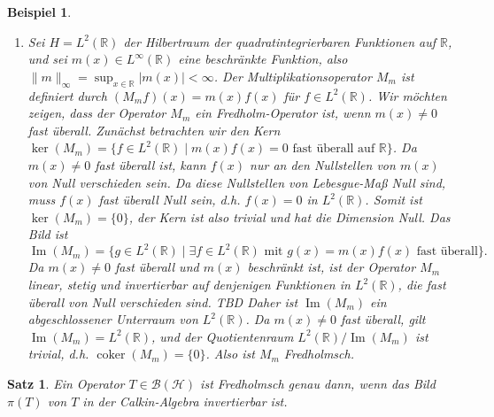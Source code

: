 \documentclass[11pt, hidelinks]{article}
\newcommand{\h}{\mathcal{H}}
\numberwithin{conj}{section}
\newtheorem{example}[conj]{Beispiel}
\newtheorem{theorem}[conj]{Satz}
\begin{document}
\begin{example}
\begin{enumerate}
        \item Sei \( H = L^2(\mathbb{R}) \) der Hilbertraum der quadratintegrierbaren Funktionen auf \( \mathbb{R} \), und sei \( m(x) \in L^\infty(\mathbb{R}) \) eine beschränkte Funktion, also \( \|m\|_\infty = \sup_{x \in \mathbb{R}} |m(x)| < \infty \). Der Multiplikationsoperator \( M_m \) ist definiert durch \( (M_m f)(x) = m(x) f(x) \) für \( f \in L^2(\mathbb{R}) \). Wir möchten zeigen, dass der Operator \( M_m \) ein Fredholm-Operator ist, wenn \( m(x) \neq 0 \) fast überall. Zunächst betrachten wir den Kern $\ker(M_m) = \{ f \in L^2(\mathbb{R}) \mid m(x) f(x) = 0 \text{ fast überall auf } \mathbb{R} \}$. Da \( m(x) \neq 0 \) fast überall ist, kann \( f(x) \) nur an den Nullstellen von \( m(x) \) von Null verschieden sein. Da diese Nullstellen von Lebesgue-Maß Null sind, muss \( f(x) \) fast überall Null sein, d.h. \( f(x) = 0 \) in \( L^2(\mathbb{R}) \). Somit ist \( \ker(M_m) = \{0\} \), der Kern ist also trivial und hat die Dimension Null. Das Bild ist $\operatorname{Im}(M_m) = \{ g \in L^2(\mathbb{R}) \mid \exists f \in L^2(\mathbb{R}) \text{ mit } g(x) = m(x) f(x) \text{ fast überall} \}.$ Da \( m(x) \neq 0 \) fast überall und \( m(x) \) beschränkt ist, ist der Operator \( M_m \) linear, stetig und invertierbar auf denjenigen Funktionen in \( L^2(\mathbb{R}) \), die fast überall von Null verschieden sind. TBD Daher ist \( \operatorname{Im}(M_m) \) ein abgeschlossener Unterraum von \( L^2(\mathbb{R}) \). Da \( m(x) \neq 0 \) fast überall, gilt \( \operatorname{Im}(M_m) = L^2(\mathbb{R}) \), und der Quotientenraum \( L^2(\mathbb{R}) / \operatorname{Im}(M_m) \) ist trivial, d.h. \( \operatorname{coker}(M_m) = \{0\} \). Also ist $M_m$ Fredholmsch.
    \end{enumerate}
\end{example}

\begin{theorem}
    Ein Operator $T \in \mathcal{B}(\h)$ ist Fredholmsch genau dann, wenn das Bild $\pi(T)$ von $T$ in der Calkin-Algebra invertierbar ist.
\end{theorem}
\end{document}
